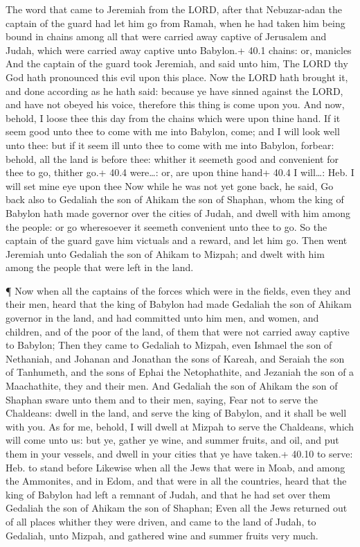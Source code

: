  The word that came to Jeremiah from the LORD, after that
Nebuzar-adan the captain of the guard had let him go from Ramah, when he
had taken him being bound in chains among all that were carried away
captive of Jerusalem and Judah, which were carried away captive unto
Babylon.+ 40.1 chains: or, manicles  And the captain of the
guard took Jeremiah, and said unto him, The LORD thy God hath pronounced
this evil upon this place.  Now the LORD hath brought it,
and done according as he hath said: because ye have sinned against the
LORD, and have not obeyed his voice, therefore this thing is come upon
you.  And now, behold, I loose thee this day from the chains
which were upon thine hand. If it seem good unto thee to come with me
into Babylon, come; and I will look well unto thee: but if it seem ill
unto thee to come with me into Babylon, forbear: behold, all the land is
before thee: whither it seemeth good and convenient for thee to go,
thither go.+ 40.4 were\ldots: or, are upon thine hand+ 40.4 I
will\ldots: Heb. I will set mine eye upon thee  Now while he
was not yet gone back, he said, Go back also to Gedaliah the son of
Ahikam the son of Shaphan, whom the king of Babylon hath made governor
over the cities of Judah, and dwell with him among the people: or go
wheresoever it seemeth convenient unto thee to go. So the captain of the
guard gave him victuals and a reward, and let him go.  Then
went Jeremiah unto Gedaliah the son of Ahikam to Mizpah; and dwelt with
him among the people that were left in the land.

 ¶ Now when all the captains of the forces which were in the
fields, even they and their men, heard that the king of Babylon had made
Gedaliah the son of Ahikam governor in the land, and had committed unto
him men, and women, and children, and of the poor of the land, of them
that were not carried away captive to Babylon;  Then they
came to Gedaliah to Mizpah, even Ishmael the son of Nethaniah, and
Johanan and Jonathan the sons of Kareah, and Seraiah the son of
Tanhumeth, and the sons of Ephai the Netophathite, and Jezaniah the son
of a Maachathite, they and their men.  And Gedaliah the son
of Ahikam the son of Shaphan sware unto them and to their men, saying,
Fear not to serve the Chaldeans: dwell in the land, and serve the king
of Babylon, and it shall be well with you.  As for me,
behold, I will dwell at Mizpah to serve the Chaldeans, which will come
unto us: but ye, gather ye wine, and summer fruits, and oil, and put
them in your vessels, and dwell in your cities that ye have taken.+
40.10 to serve: Heb. to stand before  Likewise when all the
Jews that were in Moab, and among the Ammonites, and in Edom, and that
were in all the countries, heard that the king of Babylon had left a
remnant of Judah, and that he had set over them Gedaliah the son of
Ahikam the son of Shaphan;  Even all the Jews returned out
of all places whither they were driven, and came to the land of Judah,
to Gedaliah, unto Mizpah, and gathered wine and summer fruits very much.

